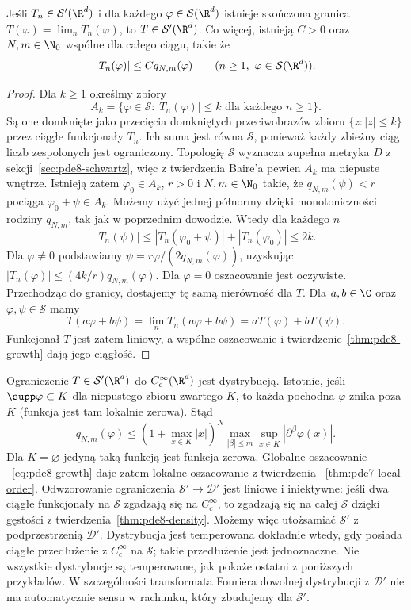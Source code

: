 \begin{stwierdzenie}
Jeśli $T_n\in\mathcal S'(\R^d)$ i dla każdego
$\varphi\in\mathcal S(\R^d)$ istnieje skończona
granica $T(\varphi)=\lim_n T_n(\varphi)$,
to $T\in\mathcal S'(\R^d)$. Co więcej, istnieją
$C>0$ oraz $N,m\in\N_0$ wspólne dla całego ciągu,
takie że
\[
 |T_n(\varphi)|\le C q_{N,m}(\varphi)
 \qquad(n\ge1,\ \varphi\in\mathcal S(\R^d)).
\]
\end{stwierdzenie}
\begin{proof}
Dla $k\ge1$ określmy zbiory
\[
 A_k=\{\varphi\in\mathcal S:
 |T_n(\varphi)|\le k\text{ dla każdego }n\ge1\}.
\]
Są one domknięte jako przecięcia domkniętych
przeciwobrazów zbioru $\{z:|z|\le k\}$ przez
ciągłe funkcjonały $T_n$. Ich suma jest równa
$\mathcal S$, ponieważ każdy zbieżny ciąg
liczb zespolonych jest ograniczony.
Topologię $\mathcal S$ wyznacza zupełna metryka
$D$ z sekcji~\ref{sec:pde8-schwartz},
więc z twierdzenia Baire'a pewien $A_k$
ma niepuste wnętrze. Istnieją zatem
$\varphi_0\in A_k$, $r>0$ i $N,m\in\N_0$
takie, że $q_{N,m}(\psi)<r$ pociąga
$\varphi_0+\psi\in A_k$. Możemy użyć jednej
półnormy dzięki monotoniczności rodziny
$q_{N,m}$, tak jak w poprzednim dowodzie.
Wtedy dla każdego $n$
\[
 |T_n(\psi)|\le
 |T_n(\varphi_0+\psi)|+|T_n(\varphi_0)|\le2k.
\]
Dla $\varphi\ne0$ podstawiamy
$\psi=r\varphi/(2q_{N,m}(\varphi))$,
uzyskując $|T_n(\varphi)|\le(4k/r)q_{N,m}(\varphi)$.
Dla $\varphi=0$ oszacowanie jest oczywiste.
Przechodząc do granicy, dostajemy tę samą
nierówność dla $T$. Dla $a,b\in\C$ oraz
$\varphi,\psi\in\mathcal S$ mamy
\[
 T(a\varphi+b\psi)=\lim_n T_n(a\varphi+b\psi)
 =aT(\varphi)+bT(\psi).
\]
Funkcjonał $T$ jest zatem liniowy, a wspólne
oszacowanie i twierdzenie~\ref{thm:pde8-growth}
dają jego ciągłość.
\end{proof}

\begin{uwaga}
Ograniczenie $T\in\mathcal S'(\R^d)$ do
$C_c^\infty(\R^d)$ jest dystrybucją.
Istotnie, jeśli $\supp\varphi\subset K$ dla
niepustego zbioru zwartego $K$, to każda
pochodna $\varphi$ znika poza $K$ (funkcja
jest tam lokalnie zerowa). Stąd
\[
 q_{N,m}(\varphi)
 \le (1+\max_{x\in K}|x|)^N
 \max_{|\beta|\le m}\sup_{x\in K}
 |\partial^\beta\varphi(x)|.
\]
Dla $K=\varnothing$ jedyną taką funkcją jest
funkcja zerowa. Globalne oszacowanie
~\eqref{eq:pde8-growth} daje zatem lokalne
oszacowanie z twierdzenia
~\ref{thm:pde7-local-order}.
Odwzorowanie ograniczenia
$\mathcal S'\to\mathcal D'$ jest liniowe
i iniektywne: jeśli dwa ciągłe funkcjonały
na $\mathcal S$ zgadzają się na $C_c^\infty$,
to zgadzają się na całej $\mathcal S$
dzięki gęstości z twierdzenia~\ref{thm:pde8-density}.
Możemy więc utożsamiać $\mathcal S'$
z podprzestrzenią $\mathcal D'$.
Dystrybucja jest temperowana dokładnie wtedy,
gdy posiada ciągłe przedłużenie z $C_c^\infty$
na $\mathcal S$; takie przedłużenie jest jednoznaczne.
Nie wszystkie dystrybucje są temperowane,
jak pokaże ostatni z poniższych przykładów.
W szczególności transformata Fouriera dowolnej
dystrybucji z $\mathcal D'$ nie ma automatycznie
sensu w rachunku, który zbudujemy dla $\mathcal S'$.
\end{uwaga}

